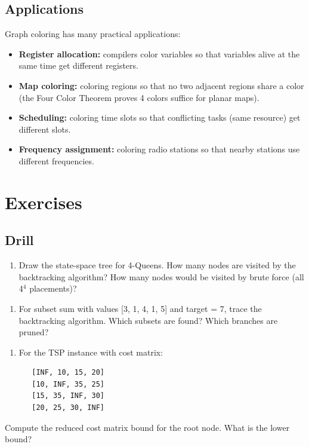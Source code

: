 \subsection{Applications}

Graph coloring has many practical applications:

\begin{itemize}
\item \textbf{Register allocation:} compilers color variables so that variables alive at the same time get different registers.
\item \textbf{Map coloring:} coloring regions so that no two adjacent regions share a color (the Four Color Theorem proves 4 colors suffice for planar maps).
\item \textbf{Scheduling:} coloring time slots so that conflicting tasks (same resource) get different slots.
\item \textbf{Frequency assignment:} coloring radio stations so that nearby stations use different frequencies.
\end{itemize}

\section{Exercises}

\subsection{Drill}

\begin{enumerate}
\item Draw the state-space tree for 4-Queens. How many nodes are visited by the backtracking algorithm? How many nodes would be visited by brute force (all 4$^{4}$ placements)?
\end{enumerate}

\begin{enumerate}
\item For subset sum with values [3, 1, 4, 1, 5] and target = 7, trace the backtracking algorithm. Which subsets are found? Which branches are pruned?
\end{enumerate}

\begin{enumerate}
\item For the TSP instance with cost matrix:
\begin{lstlisting}
   [INF, 10, 15, 20]
   [10, INF, 35, 25]
   [15, 35, INF, 30]
   [20, 25, 30, INF]
\end{lstlisting}
\end{enumerate}
   Compute the reduced cost matrix bound for the root node. What is the lower bound?

